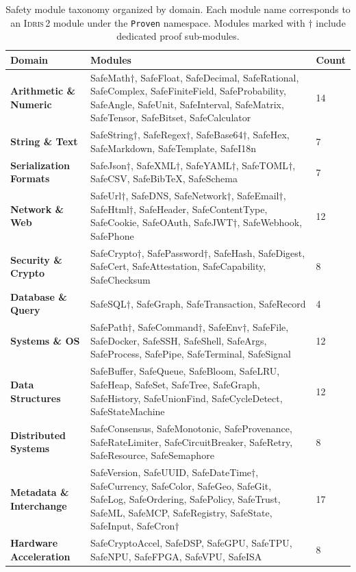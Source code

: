 \documentclass[11pt,a4paper]{article}
\newcommand{\idris}{\textsc{Idris\,2}}
\newcommand{\code}[1]{\texttt{#1}}
\begin{document}
\begin{table}[t]
\centering
\small
\caption{Safety module taxonomy organized by domain. Each module name
corresponds to an \idris{} module under the \code{Proven} namespace.
Modules marked with $\dagger$ include dedicated proof sub-modules.}
\label{tab:taxonomy}
\begin{tabularx}{\textwidth}{@{}lXl@{}}
\toprule
\textbf{Domain} & \textbf{Modules} & \textbf{Count} \\
\midrule
\textbf{Arithmetic \& Numeric}
  & SafeMath$\dagger$, SafeFloat, SafeDecimal, SafeRational,
    SafeComplex, SafeFiniteField, SafeProbability, SafeAngle,
    SafeUnit, SafeInterval, SafeMatrix, SafeTensor, SafeBitset,
    SafeCalculator
  & 14 \\
\addlinespace
\textbf{String \& Text}
  & SafeString$\dagger$, SafeRegex$\dagger$, SafeBase64$\dagger$,
    SafeHex, SafeMarkdown, SafeTemplate, SafeI18n
  & 7 \\
\addlinespace
\textbf{Serialization Formats}
  & SafeJson$\dagger$, SafeXML$\dagger$, SafeYAML$\dagger$,
    SafeTOML$\dagger$, SafeCSV, SafeBibTeX, SafeSchema
  & 7 \\
\addlinespace
\textbf{Network \& Web}
  & SafeUrl$\dagger$, SafeDNS, SafeNetwork$\dagger$, SafeEmail$\dagger$,
    SafeHtml$\dagger$, SafeHeader, SafeContentType, SafeCookie,
    SafeOAuth, SafeJWT$\dagger$, SafeWebhook, SafePhone
  & 12 \\
\addlinespace
\textbf{Security \& Crypto}
  & SafeCrypto$\dagger$, SafePassword$\dagger$, SafeHash,
    SafeDigest, SafeCert, SafeAttestation, SafeCapability,
    SafeChecksum
  & 8 \\
\addlinespace
\textbf{Database \& Query}
  & SafeSQL$\dagger$, SafeGraph, SafeTransaction, SafeRecord
  & 4 \\
\addlinespace
\textbf{Systems \& OS}
  & SafePath$\dagger$, SafeCommand$\dagger$, SafeEnv$\dagger$,
    SafeFile, SafeDocker, SafeSSH, SafeShell, SafeArgs,
    SafeProcess, SafePipe, SafeTerminal, SafeSignal
  & 12 \\
\addlinespace
\textbf{Data Structures}
  & SafeBuffer, SafeQueue, SafeBloom, SafeLRU, SafeHeap,
    SafeSet, SafeTree, SafeGraph, SafeHistory, SafeUnionFind,
    SafeCycleDetect, SafeStateMachine
  & 12 \\
\addlinespace
\textbf{Distributed Systems}
  & SafeConsensus, SafeMonotonic, SafeProvenance,
    SafeRateLimiter, SafeCircuitBreaker, SafeRetry,
    SafeResource, SafeSemaphore
  & 8 \\
\addlinespace
\textbf{Metadata \& Interchange}
  & SafeVersion, SafeUUID, SafeDateTime$\dagger$, SafeCurrency,
    SafeColor, SafeGeo, SafeGit, SafeLog, SafeOrdering,
    SafePolicy, SafeTrust, SafeML, SafeMCP, SafeRegistry,
    SafeState, SafeInput, SafeCron$\dagger$
  & 17 \\
\addlinespace
\textbf{Hardware Acceleration}
  & SafeCryptoAccel, SafeDSP, SafeGPU, SafeTPU, SafeNPU,
    SafeFPGA, SafeVPU, SafeISA
  & 8 \\
\bottomrule
\end{tabularx}
\end{table}
\end{document}
